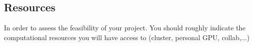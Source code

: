 \documentclass{article}
\begin{document}
\subsection{Resources}

In order to assess the feasibility of your project. You should roughly indicate the computational resources you will have access to (cluster, personal GPU, collab,...)








\end{document}
